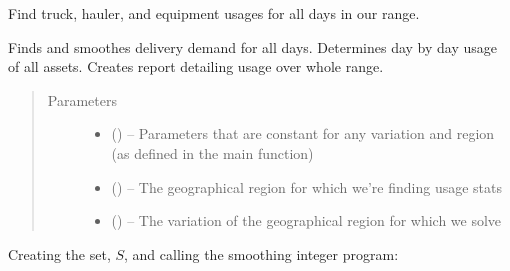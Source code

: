 \documentclass[letterpaper,10pt,english]{sphinxmanual}
\begin{document}
\begin{fulllineitems}
\label{\detokenize{variation:iterate.solve_variation}}
Find truck, hauler, and equipment usages for all days in our range.

Finds and smoothes delivery demand for all days. Determines day by day
usage of all assets. Creates report detailing usage over whole range.
\begin{quote}\begin{description}
\item[{Parameters}] \leavevmode\begin{itemize}
\item {} 
 () -- Parameters that are constant for any variation and region (as defined
in the main function)

\item {} 
 () -- The geographical region for which we're finding usage stats

\item {} 
 () -- The variation of the geographical region for which we solve

\end{itemize}

\end{description}\end{quote}

\end{fulllineitems}


Creating the set, \(S\), and calling the smoothing integer program:
\end{document}
